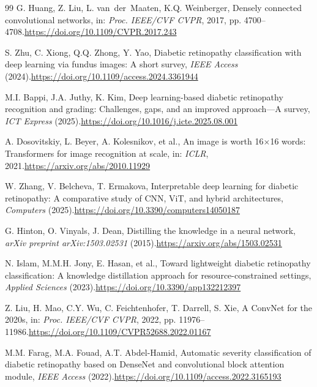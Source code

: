 \documentclass[a4paper,fleqn]{cas-dc}
\begin{document}
\begin{thebibliography}{99}
G. Huang, Z. Liu, L. van~der~Maaten, K.Q. Weinberger,
Densely connected convolutional networks,
in: \textit{Proc. IEEE/CVF CVPR}, 2017, pp. 4700--4708.\newline\url{https://doi.org/10.1109/CVPR.2017.243}

S. Zhu, C. Xiong, Q.Q. Zhong, Y. Yao,
Diabetic retinopathy classification with deep learning via fundus images: A short survey,
\textit{IEEE Access} (2024).\newline\url{https://doi.org/10.1109/access.2024.3361944}

M.I. Bappi, J.A. Juthy, K. Kim,
Deep learning-based diabetic retinopathy recognition and grading: Challenges, gaps, and an improved approach---A survey,
\textit{ICT Express} (2025).\newline\url{https://doi.org/10.1016/j.icte.2025.08.001}

A. Dosovitskiy, L. Beyer, A. Kolesnikov, et al.,
An image is worth 16$\times$16 words: Transformers for image recognition at scale,
in: \textit{ICLR}, 2021.\newline\url{https://arxiv.org/abs/2010.11929}

W. Zhang, V. Belcheva, T. Ermakova,
Interpretable deep learning for diabetic retinopathy: A comparative study of CNN, ViT, and hybrid architectures,
\textit{Computers} (2025).\newline\url{https://doi.org/10.3390/computers14050187}

G. Hinton, O. Vinyals, J. Dean,
Distilling the knowledge in a neural network,
\textit{arXiv preprint arXiv:1503.02531} (2015).\newline\url{https://arxiv.org/abs/1503.02531}

N. Islam, M.M.H. Jony, E. Hasan, et al.,
Toward lightweight diabetic retinopathy classification: A knowledge distillation approach for resource-constrained settings,
\textit{Applied Sciences} (2023).\newline\url{https://doi.org/10.3390/app132212397}

Z. Liu, H. Mao, C.Y. Wu, C. Feichtenhofer, T. Darrell, S. Xie,
A ConvNet for the 2020s,
in: \textit{Proc. IEEE/CVF CVPR}, 2022, pp. 11976--11986.\newline\url{https://doi.org/10.1109/CVPR52688.2022.01167}

M.M. Farag, M.A. Fouad, A.T. Abdel-Hamid,
Automatic severity classification of diabetic retinopathy based on DenseNet and convolutional block attention module,
\textit{IEEE Access} (2022).\newline\url{https://doi.org/10.1109/access.2022.3165193}


\end{thebibliography}
\end{document}
